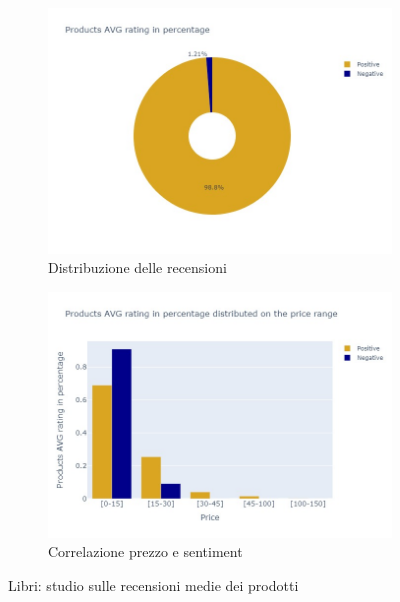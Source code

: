 				\begin{figure} [h]
					\centering
					\begin{subfigure}{0.48\textwidth}
						\includegraphics[width=\textwidth]{Figure/pie_books}
						\caption{Distribuzione delle recensioni}
						\label{fig:pie_books}
					\end{subfigure}
					\begin{subfigure}{0.48\textwidth}
						\includegraphics[width=\textwidth]{Figure/priceVSrating_books}
						\caption{Correlazione prezzo e sentiment}
						\label{fig:priceVSrating_books}
					\end{subfigure}
					\caption{Libri: studio sulle recensioni medie dei prodotti}\label{fig:price_raiting_book}
				\end{figure}
			
